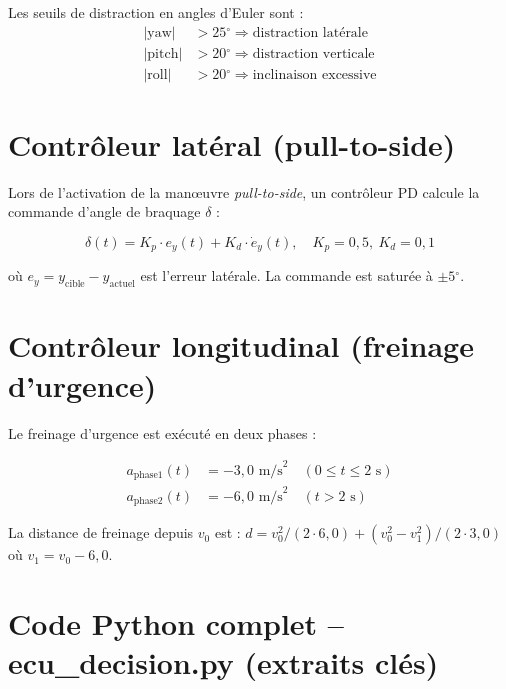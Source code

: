 \documentclass[12pt,a4paper]{report}
\newcommand{\degr}{\ensuremath{^{\circ}}}
\begin{document}
Les seuils de distraction en angles d'Euler sont :
\begin{align}
  |\text{yaw}| &> 25\degr \Rightarrow \text{distraction lat\'erale} \\
  |\text{pitch}| &> 20\degr \Rightarrow \text{distraction verticale} \\
  |\text{roll}| &> 20\degr \Rightarrow \text{inclinaison excessive}
\end{align}

\section{Contr\^oleur lat\'eral (pull-to-side)}

Lors de l'activation de la man\oe uvre \textit{pull-to-side}, un contr\^oleur PD calcule la commande d'angle de braquage $\delta$ :

\begin{equation}
  \delta(t) = K_p \cdot e_y(t) + K_d \cdot \dot{e}_y(t), \quad K_p = 0{,}5,\ K_d = 0{,}1
\end{equation}

o\`u $e_y = y_{\text{cible}} - y_{\text{actuel}}$ est l'erreur lat\'erale. La commande est satur\'ee \`a $\pm 5\degr$.

\section{Contr\^oleur longitudinal (freinage d'urgence)}

Le freinage d'urgence est ex\'ecut\'e en deux phases :

\begin{align}
  a_{\text{phase1}}(t) &= -3{,}0 \text{ m/s}^2 \quad (0 \leq t \leq 2 \text{ s}) \\
  a_{\text{phase2}}(t) &= -6{,}0 \text{ m/s}^2 \quad (t > 2 \text{ s})
\end{align}

La distance de freinage depuis $v_0$ est : $d = v_0^2/(2 \cdot 6{,}0) + (v_0^2 - v_1^2)/(2 \cdot 3{,}0)$ o\`u $v_1 = v_0 - 6{,}0$.

\section{Code Python complet -- ecu\_decision.py (extraits cl\'es)}
\end{document}
